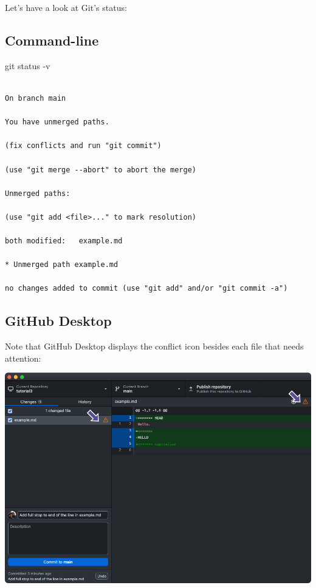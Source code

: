\documentclass[
  letterpaper,
  DIV=11,
  numbers=noendperiod]{scrartcl}
\newenvironment{Shaded}{\begin{snugshade}}{\end{snugshade}}
\newcommand{\AttributeTok}[1]{\textcolor[rgb]{0.40,0.45,0.13}{#1}}
\newcommand{\FunctionTok}[1]{\textcolor[rgb]{0.28,0.35,0.67}{#1}}
\newcommand{\NormalTok}[1]{\textcolor[rgb]{0.00,0.23,0.31}{#1}}
\begin{document}
Let's have a look at Git's status:

\subsection{Command-line}

\begin{Shaded}
\begin{Highlighting}[]

\FunctionTok{git}\NormalTok{ status }\AttributeTok{{-}v}
\end{Highlighting}
\end{Shaded}

\begin{verbatim}

On branch main

You have unmerged paths.

(fix conflicts and run "git commit")

(use "git merge --abort" to abort the merge)

Unmerged paths:

(use "git add <file>..." to mark resolution)

both modified:   example.md

* Unmerged path example.md

no changes added to commit (use "git add" and/or "git commit -a")
\end{verbatim}

\subsection{GitHub Desktop}

Note that GitHub Desktop displays the conflict icon besides each file
that needs attention:

\includegraphics{images/image54.png}
\end{document}

